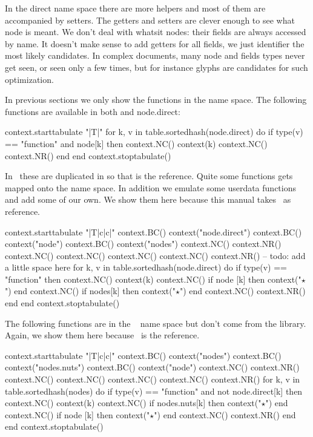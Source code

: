 In the direct name space there are more helpers and most of them are accompanied
by setters. The getters and setters are clever enough to see what node is meant.
We don't deal with whatsit nodes: their fields are always accessed by name. It
doesn't make sense to add getters for all fields, we just identifier the most
likely candidates. In complex documents, many node and fields types never get
seen, or seen only a few times, but for instance glyphs are candidates for such
optimization.

In previous sections we only show the functions in the 
name space. The following functions are available in both  and \type
{node.direct}:

\startthreerows
\startluacode
    context.starttabulate { "|T|" }
    for k, v in table.sortedhash(node.direct) do
        if type(v) == "function" and node[k] then
            context.NC() context(k)
            context.NC() context.NR()
        end
    end
    context.stoptabulate()
\stopluacode
\stopthreerows

In \CONTEXT\ these are duplicated in  so that is the reference.
Quite some functions gets mapped onto the  name space. In addition we
emulate some userdata functions and add some of our own. We show them here because
this manual takes \CONTEXT\ as reference.

\starttworows
\startluacode
    context.starttabulate { "|T|c|c|" }
        context.BC() context("node.direct")
        context.BC() context("node")
        context.BC() context("nodes")
        context.NC() context.NR()
        context.NC()
        context.NC()
        context.NC()
        context.NC() context.NR()
        -- todo: add a little space here
        for k, v in table.sortedhash(node.direct) do
            if type(v) == "function" then
                context.NC() context(k)
                context.NC() if node [k] then context("$⋆$") end
                context.NC() if nodes[k] then context("$⋆$") end
                context.NC() context.NR()
            end
        end
    context.stoptabulate()
\stopluacode
\stoptworows

The following functions are in the \CONTEXT\  name space but don't
come from the library. Again, we show them here because \CONTEXT\ is the
reference.

\starttworows
\startluacode
    context.starttabulate { "|T|c|c|" }
        context.BC() context("nodes")
        context.BC() context("nodes.nuts")
        context.BC() context("node")
        context.NC() context.NR()
        context.NC()
        context.NC()
        context.NC()
        context.NC() context.NR()
        for k, v in table.sortedhash(nodes) do
            if type(v) == "function" and not node.direct[k] then
                context.NC() context(k)
                context.NC() if nodes.nuts[k] then context("$⋆$") end
                context.NC() if node      [k] then context("$⋆$") end
                context.NC() context.NR()
            end
        end
    context.stoptabulate()
\stopluacode
\stoptworows

